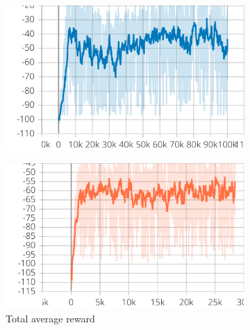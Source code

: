 \begin{figure}[t]
\begin{subfigure}[b]{0.32\textwidth}
    \end{subfigure}
    \hfill
    \begin{subfigure}[b]{0.32\textwidth}
        \centering
        \includegraphics[width=\textwidth]{papers/coordination2023/imgs/cohesion-ctde.pdf}
    \end{subfigure}
    \par\bigskip
    \begin{subfigure}[b]{0.32\textwidth}
        \centering
        \includegraphics[width=\textwidth]{papers/coordination2023/imgs/reward-dtde.pdf}
        \caption{Total average reward}
        \label{coordination2023:fig:reward-dcc}
    \end{subfigure}
    \hfill
    \begin{subfigure}[b]{0.32\textwidth}
        \centering

\end{subfigure}
\end{figure}
